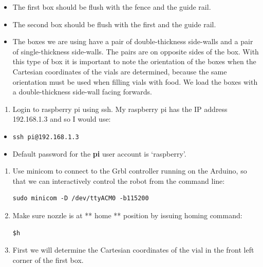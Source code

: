 \documentclass[]{book}
\providecommand{\tightlist}{%
  \setlength{\itemsep}{0pt}\setlength{\parskip}{0pt}}
\theoremstyle{definition}
\theoremstyle{definition}
\theoremstyle{remark}
\begin{document}
\begin{itemize}
\tightlist
\item
  The first box should be flush with the fence and the guide rail.
\item
  The second box should be flush with the first and the guide rail.
\item
  The boxes we are using have a pair of double-thickness side-walls and
  a pair of single-thickness side-walls. The pairs are on opposite sides
  of the box. With this type of box it is important to note the
  orientation of the boxes when the Cartesian coordinates of the vials
  are determined, because the same orientation must be used when filling
  vials with food. We load the boxes with a double-thickness side-wall
  facing forwards.
\end{itemize}

\begin{enumerate}
\def\labelenumi{\arabic{enumi}.}
\setcounter{enumi}{1}
\tightlist
\item
  Login to raspberry pi using ssh. My raspberry pi has the IP address
  192.168.1.3 and so I would use:
\end{enumerate}

\begin{itemize}
\tightlist
\item
  \texttt{ssh\ pi@192.168.1.3}
\item
  Default password for the \textbf{pi} user account is `raspberry'.
\end{itemize}

\begin{enumerate}
\def\labelenumi{\arabic{enumi}.}
\setcounter{enumi}{2}
\item
  Use minicom to connect to the Grbl controller running on the Arduino,
  so that we can interactively control the robot from the command line:

\begin{verbatim}
sudo minicom -D /dev/ttyACM0 -b115200
\end{verbatim}
\item
  Make sure nozzle is at ** home ** position by issuing homing command:

\begin{verbatim}
$h
\end{verbatim}
\item
  First we will determine the Cartesian coordinates of the vial in the
  front left corner of the first box.
\end{enumerate}
\end{document}
